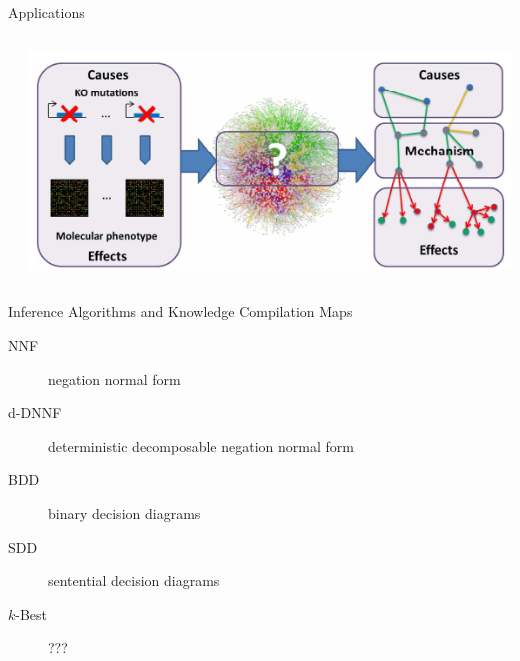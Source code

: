 \documentclass{beamer}
\begin{document}
\begin{frame}{Applications}
\begin{columns}[b]
\begin{column}{0.5\textwidth}
    \end{column}
    \begin{column}{0.5\textwidth}
      \includegraphics[width=\textwidth]{application4.png}
      {\small \cite{de2013phenetic}}
    \end{column}
  \end{columns}
\end{frame}

\begin{frame}{Inference Algorithms and Knowledge Compilation Maps}
  \begin{description}
  \item[NNF] negation normal form
  \item[d-DNNF] deterministic decomposable negation normal form
  \item[BDD] binary decision diagrams
  \item[SDD] sentential decision diagrams
  \item[$k$-Best] ???
  \end{description}
\end{frame}
\end{document}
